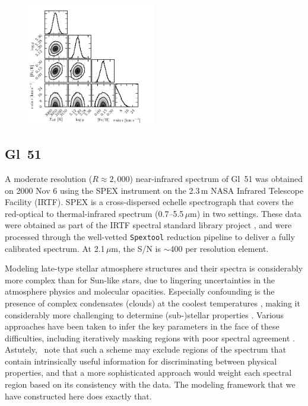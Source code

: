 \documentclass[iop,floatfix,numberedappendix,twocolappendix]{emulateapj}
\begin{document}
\begin{figure}[!b]
  \includegraphics[width=0.5\textwidth]{figs/Gl51_triangle.pdf}
\end{figure}

\subsection{Gl~51}

A moderate resolution ($R\approx2,000$) near-infrared spectrum of Gl~51 was obtained on 2000 
Nov 6 using the SPEX instrument \citep{rayner03} on the 2.3\,m NASA Infrared Telescope Facility 
(IRTF).  SPEX is a cross-dispersed echelle spectrograph that covers the red-optical to 
thermal-infrared spectrum (0.7--5.5\,$\mu$m) in two settings.  These data were obtained as part of 
the IRTF spectral standard library project \citep{cushing05,rayner09}, and were processed through 
the well-vetted {\tt Spextool} reduction pipeline \citep{cushing04,vacca03} to deliver a fully 
calibrated spectrum.  At 2.1\,$\mu$m, the S/N is $\sim$400 per resolution element.

Modeling late-type stellar atmosphere structures and their spectra is considerably more complex 
than for Sun-like stars, due to lingering uncertainties in the atmosphere physics and molecular 
opacities.  Especially confounding is the presence of complex condensates (clouds) at the coolest 
temperatures \citep{allard13}, making it considerably more challenging to determine (sub-)stellar 
properties \citep{rajpurohit14}.  Various approaches have been taken to infer the key parameters in 
the face of these difficulties, including iteratively masking regions with poor spectral agreement 
\citep[e.g.,][]{mann13}.  Astutely, \citeauthor{mann13}~note that such a scheme may exclude 
regions of the spectrum that contain intrinsically useful information for discriminating between 
physical properties, and that a more sophisticated approach would weight each spectral region based 
on its consistency with the data.  The modeling framework that we have constructed here does 
exactly that.
\end{document}
